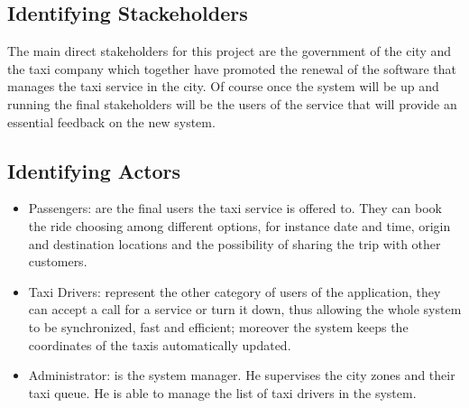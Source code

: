 \documentclass[a4paper,11pt]{report} %
\begin{document}
			
	\subsection{Identifying Stackeholders} The main direct stakeholders for this project are the government of the city and the taxi company which together have promoted the renewal of the software that manages the taxi service in the city. Of course once the system will be up and running the final stakeholders will be the users of the service that will provide an essential feedback on the new system.
	
	\subsection{Identifying Actors}
		\begin{itemize}
			\item Passengers: are the final users the taxi service is offered to. They can book the ride choosing among different options, for instance date and time, origin and destination locations and the possibility of sharing the trip with other customers.
			\item Taxi Drivers: represent the other category of users of the application, they can accept a call for a service or turn it down, thus allowing the whole system to be synchronized, fast and efficient; moreover the system keeps the coordinates of the taxis automatically updated.
			
			\item Administrator: is the system manager. He supervises the city zones and their taxi queue. He is able to manage the list of taxi drivers in the system.
		\end{itemize}
	
\end{document}
